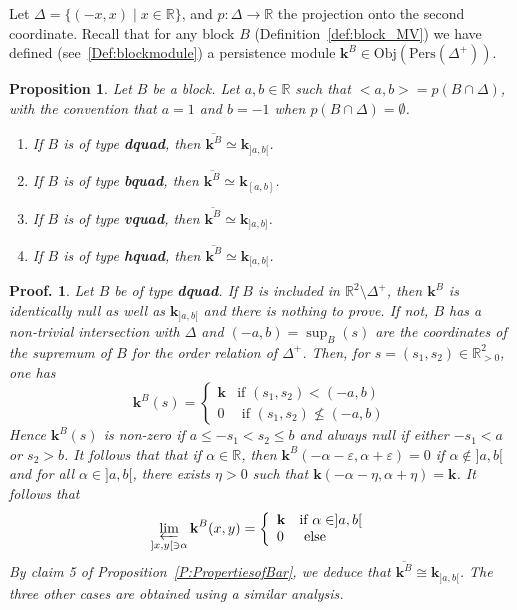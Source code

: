 \documentclass[a4paper, english, 11pt]{article}
\newcommand{\kk}[0]{\textbf{k}}
\newcommand{\Pe}{\text{Pers}}
\newcommand{\0}{\vec{0}}
\newcommand{\R}[0]{\mathbb{R}}
\newcommand{\Obj}[0]{\text{Obj}}
\newtheorem{prop}{Proposition}[section]
\newtheorem*{pf}{Proof.} }
\begin{document}
Let $\Delta = \{(-x,x)\mid x\in\R\}$, and $p : \Delta \longrightarrow \R$ the projection onto the second coordinate. Recall that for any block $B$ (Definition~\ref{def:block_MV}) we have defined (see~\ref{Def:blockmodule}) a persistence module $\kk^B\in \Obj(\Pe(\Delta^+))$.
\begin{prop}\label{P:BarofBlock}
Let $B$ be a block. Let $a,b\in \R$ such that $<a,b> = p(B\cap \Delta)$, with the convention that $a=1$ and $b=-1$ when $ p(B\cap \Delta) = \emptyset$.  
\begin{enumerate}
    \item If $B$ is of type \textbf{dquad}, then $\overline{\kk^B} \simeq \kk_{]a,b[}$.
    \item If $B$ is of type \textbf{bquad}, then $\overline{\kk^B} \simeq \kk_{[a,b]}$.
    \item If $B$ is of type \textbf{vquad}, then $\overline{\kk^B} \simeq \kk_{]a,b]}$.
    \item If $B$ is of type \textbf{hquad}, then $\overline{\kk^B} \simeq \kk_{[a,b[}$.
\end{enumerate}
\end{prop}
\begin{pf}
Let $B$ be of type \textbf{dquad}. If $B$ is included in $\mathbb{R}^2\setminus \Delta^+$, then $\kk^B$ is identically null as well as $\kk_{]a,b[}$ and there is nothing to prove. If not, $B$ has a non-trivial intersection with $\Delta$ and   $(-a,b)=\sup_{B}(s)$ are the coordinates of the supremum of $B$ for the order relation of $\Delta^+$. Then, for  $s=(s_1,s_2)\in \mathbb{R}^2_{>0}$, one has 
$$\kk^B(s) =\left\{ \begin{array}{ll} \kk & \mbox{if } (s_1,s_2)< (-a,b) \\
0 & \mbox{ if } (s_1, s_2) \not\leqslant (-a,b)\end{array}\right . $$ 
Hence $\kk^B(s)$ is non-zero  if $ a\leq -s_1 <s_2 \leq b$ and always null if either $-s_1<a$ or $s_2 >b$. It follows that 
that if $\alpha \in \mathbb{R}$, then $ \kk^B(-\alpha-\varepsilon, \alpha+\varepsilon) =0$ 
if $\alpha \notin ]a,b[$ and for all $\alpha \in ]a,b[$, there exists $\eta >0$ such that 
$\kk(-\alpha -\eta, \alpha+\eta) =\kk$. It follows that
\begin{equation}\varprojlim_{]x, y[ \ni \alpha} \kk^B(x,y) = \left\{ \begin{array}{ll} \kk & \mbox{if } \alpha \in ]a,b[ \\
0 & \mbox{ else }\end{array}\right . 
 \end{equation}
By claim 5 of Proposition~\ref{P:PropertiesofBar}, we deduce that $\overline{\kk^B} \cong \kk_{]a,b[}$.
The three other cases are obtained using a similar analysis.
\end{pf}
\end{document}
